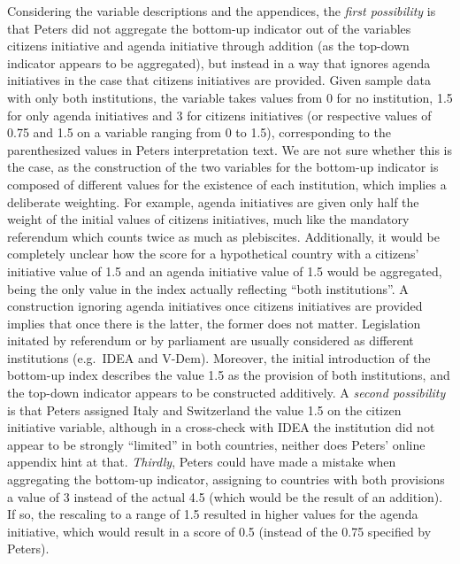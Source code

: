 \documentclass[]{article}
\begin{document}
Considering the variable descriptions and the appendices, the
\emph{first possibility} is that Peters did not aggregate the bottom-up
indicator out of the variables citizens initiative and agenda initiative
through addition (as the top-down indicator appears to be aggregated),
but instead in a way that ignores agenda initiatives in the case that
citizens initiatives are provided. Given sample data with only both
institutions, the variable takes values from 0 for no institution, 1.5
for only agenda initiatives and 3 for citizens initiatives (or
respective values of 0.75 and 1.5 on a variable ranging from 0 to 1.5),
corresponding to the parenthesized values in Peters interpretation text.
We are not sure whether this is the case, as the construction of the two
variables for the bottom-up indicator is composed of different values
for the existence of each institution, which implies a deliberate
weighting. For example, agenda initiatives are given only half the
weight of the initial values of citizens initiatives, much like the
mandatory referendum which counts twice as much as plebiscites.
Additionally, it would be completely unclear how the score for a
hypothetical country with a citizens' initiative value of 1.5 and an
agenda initiative value of 1.5 would be aggregated, being the only value
in the index actually reflecting ``both institutions''. A construction
ignoring agenda initiatives once citizens initiatives are provided
implies that once there is the latter, the former does not matter.
Legislation initated by referendum or by parliament are usually
considered as different institutions (e.g.~IDEA and V-Dem). Moreover,
the initial introduction of the bottom-up index describes the value 1.5
as the provision of both institutions, and the top-down indicator
appears to be constructed additively. A \emph{second possibility} is
that Peters assigned Italy and Switzerland the value 1.5 on the citizen
initiative variable, although in a cross-check with IDEA the institution
did not appear to be strongly ``limited'' in both countries, neither
does Peters' online appendix hint at that. \emph{Thirdly}, Peters could
have made a mistake when aggregating the bottom-up indicator, assigning
to countries with both provisions a value of 3 instead of the actual 4.5
(which would be the result of an addition). If so, the rescaling to a
range of 1.5 resulted in higher values for the agenda initiative, which
would result in a score of 0.5 (instead of the 0.75 specified by
Peters).
\end{document}
